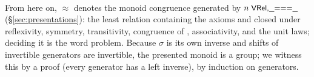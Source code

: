 \begin{code}
\AgdaSpace{}%
\AgdaSpace{}%
\AgdaOperator{\AgdaInductiveConstructor{]ʷ}}\AgdaSpace{}%
\AgdaOperator{\AgdaDatatype{===}}\AgdaSpace{}%
\AgdaOperator{\AgdaInductiveConstructor{[}}\AgdaSpace{}%
\AgdaSpace{}%
\AgdaSpace{}%
\AgdaOperator{\AgdaInductiveConstructor{]ʷ}}\AgdaSpace{}%
\AgdaSpace{}%
\AgdaOperator{\AgdaInductiveConstructor{[}}\AgdaSpace{}%
\AgdaSpace{}%
\AgdaSpace{}%
\AgdaOperator{\AgdaInductiveConstructor{]ʷ}}\<%
\\
%
\>[2]\AgdaSpace{}%
\AgdaSymbol{:}\AgdaSpace{}%
\AgdaSymbol{(}\AgdaSpace{}%
\AgdaSymbol{:}\AgdaSpace{}%
\AgdaSpace{}%
\AgdaSymbol{)}\AgdaSpace{}%
\AgdaSymbol{(}\AgdaSpace{}%
\AgdaSymbol{:}\AgdaSpace{}%
\AgdaSpace{}%
\AgdaSymbol{)}\AgdaSpace{}%
\AgdaSpace{}%
\AgdaSymbol{(}\AgdaSpace{}%
\AgdaSymbol{)}\AgdaSpace{}%
\AgdaSpace{}%
\AgdaOperator{\AgdaInductiveConstructor{[}}\AgdaSpace{}%
\AgdaSpace{}%
\AgdaSpace{}%
\AgdaSpace{}%
\AgdaOperator{\AgdaInductiveConstructor{]ʷ}}\AgdaSpace{}%
\AgdaSpace{}%
\AgdaOperator{\AgdaInductiveConstructor{[}}\AgdaSpace{}%
\AgdaSpace{}%
\AgdaSpace{}%
\AgdaOperator{\AgdaInductiveConstructor{]ʷ}}\AgdaSpace{}%
\AgdaOperator{\AgdaDatatype{===}}\AgdaSpace{}%
\AgdaOperator{\AgdaInductiveConstructor{[}}\AgdaSpace{}%
\AgdaSpace{}%
\AgdaSpace{}%
\AgdaOperator{\AgdaInductiveConstructor{]ʷ}}\AgdaSpace{}%
\AgdaSpace{}%
\AgdaOperator{\AgdaInductiveConstructor{[}}\AgdaSpace{}%
\AgdaSpace{}%
\AgdaSpace{}%
\AgdaSpace{}%
\AgdaOperator{\AgdaInductiveConstructor{]ʷ}}\<%
\end{code}

From here on,
$\approx$ denotes the monoid congruence generated by
$n\;\mbox{\textsf{\small VRel,{\_}==={\_}}}$ (\S\ref{sec:presentations}): the least relation
containing the axioms and closed under reflexivity, symmetry, transitivity,
congruence of , associativity, and the unit laws; deciding it is
the word problem.  Because $\sigma$ is its own inverse and shifts of
invertible generators are invertible, the presented monoid is a group; we
witness this by a  proof (every generator has a left
inverse), by induction on generators.

